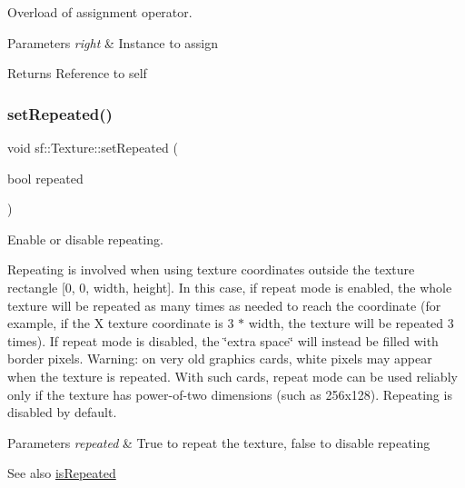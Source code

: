 Overload of assignment operator. 


\begin{DoxyParams}{Parameters}
{\em right} & Instance to assign\\
\hline
\end{DoxyParams}
\begin{DoxyReturn}{Returns}
Reference to self \begin{DoxyVerb}\end{DoxyVerb}
 
\end{DoxyReturn}
\mbox{\label{classsf_1_1_texture_aaa87d1eff053b9d4d34a24c784a28658}} 
\subsubsection{\texorpdfstring{setRepeated()}{setRepeated()}}
{\footnotesize\ttfamily void sf\+::\+Texture\+::set\+Repeated (\begin{DoxyParamCaption}\item[{bool}]{repeated }\end{DoxyParamCaption})}



Enable or disable repeating. 

Repeating is involved when using texture coordinates outside the texture rectangle \mbox{[}0, 0, width, height\mbox{]}. In this case, if repeat mode is enabled, the whole texture will be repeated as many times as needed to reach the coordinate (for example, if the X texture coordinate is 3 $\ast$ width, the texture will be repeated 3 times). If repeat mode is disabled, the \char`\"{}extra space\char`\"{} will instead be filled with border pixels. Warning\+: on very old graphics cards, white pixels may appear when the texture is repeated. With such cards, repeat mode can be used reliably only if the texture has power-\/of-\/two dimensions (such as 256x128). Repeating is disabled by default.


\begin{DoxyParams}{Parameters}
{\em repeated} & True to repeat the texture, false to disable repeating\\
\hline
\end{DoxyParams}
\begin{DoxySeeAlso}{See also}
\mbox{\hyperlink{classsf_1_1_texture_af1a1a32ca5c799204b2bea4040df7647}{is\+Repeated}} \begin{DoxyVerb}\end{DoxyVerb}
 
\end{DoxySeeAlso}
\mbox{\label{classsf_1_1_texture_a0c3bd6825b9a99714f10d44179d74324}} 
